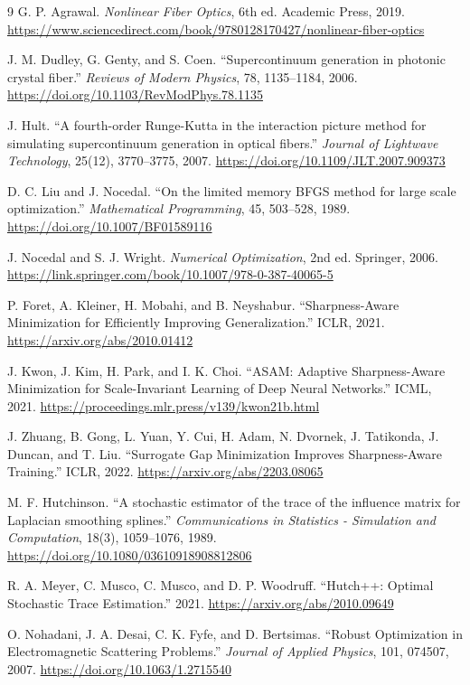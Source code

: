 \documentclass[11pt]{article}
\begin{document}
\begin{thebibliography}{9}
G. P. Agrawal. \textit{Nonlinear Fiber Optics}, 6th ed. Academic Press, 2019.
\url{https://www.sciencedirect.com/book/9780128170427/nonlinear-fiber-optics}

J. M. Dudley, G. Genty, and S. Coen. ``Supercontinuum generation in photonic
crystal fiber.'' \textit{Reviews of Modern Physics}, 78, 1135--1184, 2006.
\url{https://doi.org/10.1103/RevModPhys.78.1135}

J. Hult. ``A fourth-order Runge-Kutta in the interaction picture method for
simulating supercontinuum generation in optical fibers.'' \textit{Journal of
Lightwave Technology}, 25(12), 3770--3775, 2007.
\url{https://doi.org/10.1109/JLT.2007.909373}

D. C. Liu and J. Nocedal. ``On the limited memory BFGS method for large scale
optimization.'' \textit{Mathematical Programming}, 45, 503--528, 1989.
\url{https://doi.org/10.1007/BF01589116}

J. Nocedal and S. J. Wright. \textit{Numerical Optimization}, 2nd ed.
Springer, 2006. \url{https://link.springer.com/book/10.1007/978-0-387-40065-5}

P. Foret, A. Kleiner, H. Mobahi, and B. Neyshabur. ``Sharpness-Aware
Minimization for Efficiently Improving Generalization.'' ICLR, 2021.
\url{https://arxiv.org/abs/2010.01412}

J. Kwon, J. Kim, H. Park, and I. K. Choi. ``ASAM: Adaptive Sharpness-Aware
Minimization for Scale-Invariant Learning of Deep Neural Networks.'' ICML,
2021. \url{https://proceedings.mlr.press/v139/kwon21b.html}

J. Zhuang, B. Gong, L. Yuan, Y. Cui, H. Adam, N. Dvornek, J. Tatikonda,
J. Duncan, and T. Liu. ``Surrogate Gap Minimization Improves Sharpness-Aware
Training.'' ICLR, 2022. \url{https://arxiv.org/abs/2203.08065}

M. F. Hutchinson. ``A stochastic estimator of the trace of the influence matrix
for Laplacian smoothing splines.'' \textit{Communications in Statistics -
Simulation and Computation}, 18(3), 1059--1076, 1989.
\url{https://doi.org/10.1080/03610918908812806}

R. A. Meyer, C. Musco, C. Musco, and D. P. Woodruff. ``Hutch++: Optimal
Stochastic Trace Estimation.'' 2021. \url{https://arxiv.org/abs/2010.09649}

O. Nohadani, J. A. Desai, C. K. Fyfe, and D. Bertsimas. ``Robust Optimization
in Electromagnetic Scattering Problems.'' \textit{Journal of Applied Physics},
101, 074507, 2007. \url{https://doi.org/10.1063/1.2715540}
\end{thebibliography}
\end{document}
